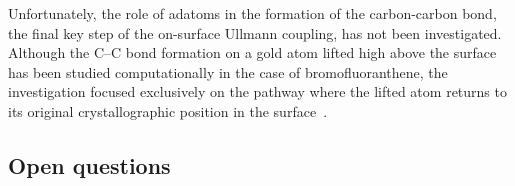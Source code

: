 \documentclass[journal=jacsat,manuscript=article]{achemso}
\newcommand{\lock}{\color{red}}
\newcommand{\lock}{\color{black}}
\begin{document}




{\lock

Unfortunately, the role of adatoms in the formation of the carbon-carbon bond, the final key step of the on-surface Ullmann coupling, has not been investigated. Although the C--C bond formation on a gold atom lifted high above the surface has been studied computationally in the case of bromofluoranthene,
the investigation focused exclusively on the pathway where the lifted atom returns to its original crystallographic position in the surface~\cite{jpcc2018}. 

}

\ifdefined\INTERNAL

\subsection{Open questions}
\end{document}

